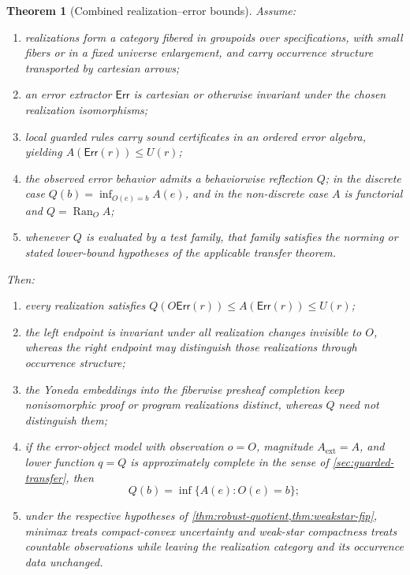 \documentclass[12pt,a4paper,twoside]{extarticle}
\theoremstyle{compactplain}
\newtheorem{theorem}{Theorem}[section]
\theoremstyle{compactdef}
\newcommand{\Err}{\mathsf{Err}}
\newcommand{\Ran}{\operatorname{Ran}}
\begin{document}
\begin{theorem}[Combined realization--error bounds]\label{thm:integrated}
Assume:
\begin{enumerate}[label=(I\arabic*)]
\item realizations form a category fibered in groupoids over specifications, with small fibers or in a fixed universe enlargement, and carry occurrence structure transported by cartesian arrows;
\item an error extractor $\Err$ is cartesian or otherwise invariant under the chosen realization isomorphisms;
\item local guarded rules carry sound certificates in an ordered error algebra, yielding $A(\Err(r))\le U(r)$;
\item the observed error behavior admits a behaviorwise reflection $Q$; in the discrete case $Q(b)=\inf_{O(e)=b}A(e)$, and in the non-discrete case $A$ is functorial and $Q=\Ran_OA$;
\item whenever $Q$ is evaluated by a test family, that family satisfies the norming or stated lower-bound hypotheses of the applicable transfer theorem.
\end{enumerate}
Then:
\begin{enumerate}[label=(\alph*)]
\item every realization satisfies $Q(O\Err(r))\le A(\Err(r))\le U(r)$;
\item the left endpoint is invariant under all realization changes invisible to $O$, whereas the right endpoint may distinguish those realizations through occurrence structure;
\item the Yoneda embeddings into the fiberwise presheaf completion keep nonisomorphic proof or program realizations distinct, whereas $Q$ need not distinguish them;
\item if the error-object model with observation $o=O$, magnitude $A_{\mathrm{ext}}=A$, and lower function $q=Q$ is approximately complete in the sense of \cref{sec:guarded-transfer}, then
\[
  Q(b)=\inf\{A(e):O(e)=b\};
\]
\item under the respective hypotheses of \cref{thm:robust-quotient,thm:weakstar-fip}, minimax treats compact-convex uncertainty and weak-star compactness treats countable observations while leaving the realization category and its occurrence data unchanged.
\end{enumerate}
\end{theorem}
\end{document}
